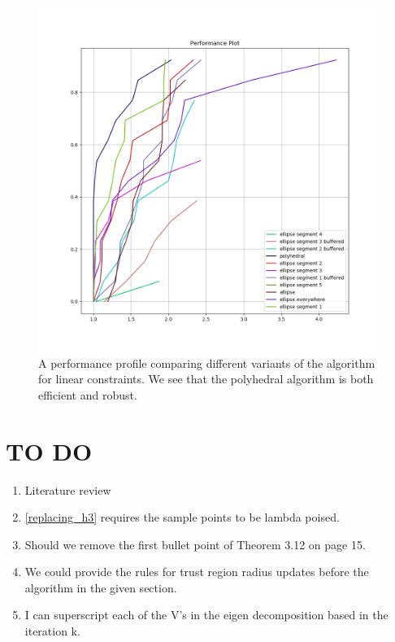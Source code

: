 \documentclass{article}
\begin{document}
	
\begin{figure}[ht]
    \centering
    \includegraphics[scale=0.4]{images/performance_profile_plot.png}
    \caption[A performance profile comparing variants of the algorithm for linear constraints.]{
    	A performance profile comparing different variants of the algorithm for linear constraints.
    	We see that the polyhedral algorithm is both efficient and robust.
    }
    \label{performance_profile_image}
\end{figure}

\section{TO DO}
\begin{enumerate}
\item Literature review
\item \cref{replacing_h3} requires the sample points to be lambda poised.
\item Should we remove the first bullet point of Theorem 3.12 on page 15.
\item We could provide the rules for trust region radius updates before the algorithm in the given section.
\item I can superscript each of the V's in the eigen decomposition based in the iteration k.
\end{enumerate}





\end{document}
